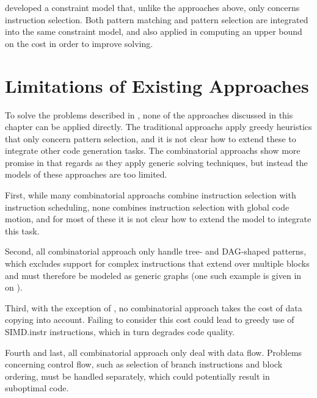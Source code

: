 \textcite{Beg:2013} developed a \gls{constraint model} that, unlike the
approaches above, only concerns \gls{instruction selection}.
%
Both \gls{pattern matching} and \gls{pattern selection} are integrated into the
same \gls{constraint model}, and \citeauthor{Beg:2013} also applied
 in computing an upper bound on the cost
in order to improve solving.



\section{Limitations of Existing Approaches}

To solve the problems described in , none of the
approaches discussed in this chapter can be applied directly.
%
The \glspl{traditional approach} apply greedy heuristics that only concern
\gls{pattern selection}, and it is not clear how to extend these to integrate
other \gls{code generation} tasks.
%
The \glspl{combinatorial approach} show more promise in that regards as they
apply generic solving techniques, but instead the models of these approaches are
too limited.

First, while many \glspl{combinatorial approach} combine \gls{instruction
  selection} with \gls{instruction scheduling}, none combines \gls{instruction
  selection} with \gls{global code motion}, and for most of these it is not
clear how to extend the model to integrate this task.

Second, all \gls{combinatorial approach} only handle tree- and \gls{DAG}-shaped
\glspl{pattern}, which excludes support for complex \glspl{instruction} that
extend over multiple \glspl{block} and must therefore be modeled as generic
\glspl{graph} (one such example is given in on ).

Third, with the exception of \textcite{TanakaEtAl:2003}, no \gls{combinatorial
  approach} takes the cost of \gls{data copying} into account.
%
Failing to consider this cost could lead to greedy use of \gls{SIMD.instr}
\glspl{instruction}, which in turn degrades code quality.

Fourth and last, all \gls{combinatorial approach} only deal with data flow.
%
Problems concerning control flow, such as selection of branch
\glspl{instruction} and \gls{block ordering}, must be handled separately, which
could potentially result in suboptimal code.

